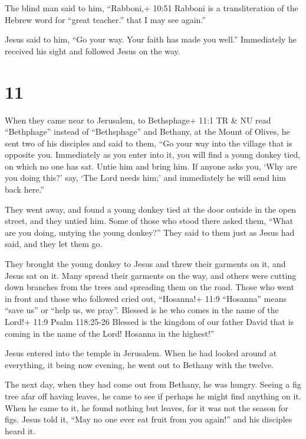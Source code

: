 The blind man said to him, ``Rabboni,+ 10:51 Rabboni is a
transliteration of the Hebrew word for ``great teacher.'' that I may see
again.''

 Jesus said to him, ``Go your way. Your faith has made you
well.'' Immediately he received his sight and followed Jesus on the way.

\hypertarget{section-10}{%
\section{11}\label{section-10}}

 When they came near to Jerusalem, to Bethsphage+ 11:1 TR \&
NU read ``Bethphage'' instead of ``Bethsphage'' and Bethany, at the
Mount of Olives, he sent two of his disciples  and said to
them, ``Go your way into the village that is opposite you. Immediately
as you enter into it, you will find a young donkey tied, on which no one
has sat. Untie him and bring him.  If anyone asks you, `Why
are you doing this?' say, `The Lord needs him;' and immediately he will
send him back here.''

 They went away, and found a young donkey tied at the door
outside in the open street, and they untied him.  Some of
those who stood there asked them, ``What are you doing, untying the
young donkey?''  They said to them just as Jesus had said,
and they let them go.

 They brought the young donkey to Jesus and threw their
garments on it, and Jesus sat on it.  Many spread their
garments on the way, and others were cutting down branches from the
trees and spreading them on the road.  Those who went in
front and those who followed cried out, ``Hosanna!+ 11:9 ``Hosanna''
means ``save us'' or ``help us, we pray''. Blessed is he who comes in
the name of the Lord!+ 11:9 Psalm 118:25-26  Blessed is the
kingdom of our father David that is coming in the name of the Lord!
Hosanna in the highest!''

 Jesus entered into the temple in Jerusalem. When he had
looked around at everything, it being now evening, he went out to
Bethany with the twelve.

 The next day, when they had come out from Bethany, he was
hungry.  Seeing a fig tree afar off having leaves, he came
to see if perhaps he might find anything on it. When he came to it, he
found nothing but leaves, for it was not the season for figs.
 Jesus told it, ``May no one ever eat fruit from you
again!'' and his disciples heard it.

